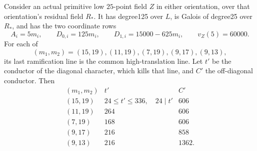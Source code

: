 \begin{lemma}
\label{lem:B-RD96-opposite}
Consider an actual primitive low $25$-point field $Z$ in either
orientation, over that orientation's residual field $R_*$. It has
degree125 over $L$, is Galois of degree25 over $R_*$, and has the
two coordinate rows
\[
 A_i=5m_i,\qquad D_{0,i}=125m_i,\qquad
 D_{1,i}=15000-625m_i,\qquad v_Z(5)=60000.
                                                        \tag{B-RD96.6}
\]
For each of
\[
             (m_1,m_2)=(15,19),(11,19),(7,19),(9,17),(9,13),
                                                        \tag{B-RD96.7}
\]
its last ramification line is the common high-translation line.
Let $t'$ be the conductor of the diagonal character, which kills
that line, and $C'$ the off-diagonal conductor. Then
\[
\begin{array}{c|c|r}
 (m_1,m_2)&t'&C'\\\hline
 (15,19)&24\le t'\le336,\quad24\mid t'&606\\
 (11,19)&264&606\\
 (7,19)&168&606\\
 (9,17)&216&858\\
 (9,13)&216&1362.
\end{array}                                             \tag{B-RD96.8}
\]
\end{lemma}
